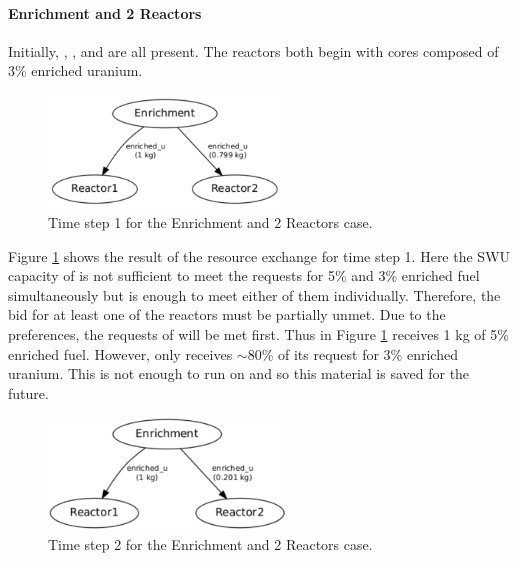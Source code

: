\paragraph{Enrichment and 2 Reactors}
\label{subsect::1enr2rxts}

Initially, \Enrichment{}, , and  are all present. The reactors both begin with cores composed of 3\% enriched uranium. 

\begin{figure}
  \begin{center}
    \includegraphics[height=3cm]{./figs/1_Enrichment_2_Reactor-t1.pdf}
    \caption[]{\label{fig::enr2rxts-t1}Time step 1 for the Enrichment and 2 Reactors 
        case.}
  \end{center}
\end{figure}

Figure \ref{fig::enr2rxts-t1} shows the result of the resource exchange for time
step 1.  Here the SWU capacity of \Enrichment{} is not sufficient to meet the
requests for 5\% and 3\% enriched fuel simultaneously but is enough to meet
either of them individually.  Therefore, the bid for at least one of the
reactors must be partially unmet.  Due to the preferences, the requests
of  will be met first.  Thus in
Figure \ref{fig::enr2rxts-t1}  receives 1 kg of 5\% enriched fuel.
However,  only receives $\sim$80\% of its request for 3\% enriched
uranium.  This is not enough to run on and so this material is saved for the
future.

\begin{figure}
  \begin{center}
    \includegraphics[height=3cm]{./figs/1_Enrichment_2_Reactor-t2.pdf}
    \caption[]{\label{fig::enr2rxts-t2}Time step 2 for the Enrichment and 2 Reactors 
        case.}
  \end{center}
\end{figure}

